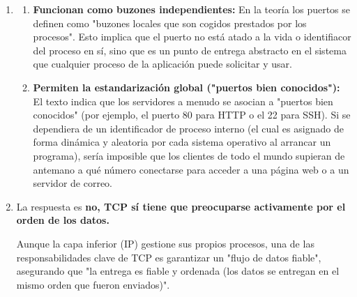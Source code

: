 \begin{enumerate}[label=\color{red}\textbf{\arabic*)}]
	      A pesar de que multiplicamos la capacidad de la línea por 1000 (pasando de 1 Mbps a 1 Gbps), el tiempo de respuesta total \textbf{solo se redujo a la mitad} (de $\sim 2$ ms a $\sim 1$ ms). Esto demuestra que en enlaces de alta velocidad, el tiempo de transmisión se vuelve insignificante y el \textbf{retardo de propagación (RTT) domina por completo la comunicación}. Es por este motivo que protocolos como TCP utilizan ventanas deslizantes para serializar los datos y mantener la red ocupada en lugar de esperar una respuesta por cada paquete enviado.
	\item {}
	      \begin{enumerate}[label=\arabic*)]
		      \item \textbf{Funcionan como buzones independientes:} En la teoría los puertos se definen como "buzones locales que son cogidos prestados por los procesos". Esto implica que el puerto no está atado a la vida o identifiacor del proceso en sí, sino que es un punto de entrega abstracto en el sistema que cualquier proceso de la aplicación puede solicitar y usar.
		      \item \textbf{Permiten la estandarización global ("puertos bien conocidos"):} El texto indica que los servidores a menudo se asocian a "puertos bien conocidos" (por ejemplo, el puerto 80 para HTTP o el 22 para SSH). Si se dependiera de un identificador de proceso interno (el cual es asignado de forma dinámica y aleatoria por cada sistema operativo al arrancar un programa), sería imposible que los clientes de todo el mundo supieran de antemano a qué número conectarse para acceder a una página web o a un servidor de correo.
	      \end{enumerate}
	\item {}

	      La respuesta es \textbf{no, TCP sí tiene que preocuparse activamente por el orden de los datos.}

	      Aunque la capa inferior (IP) gestione sus propios procesos, una de las responsabilidades clave de TCP es garantizar un "flujo de datos fiable", asegurando que "la entrega es fiable y ordenada (los datos se entregan en el mismo orden que fueron enviados)".


\end{enumerate}
